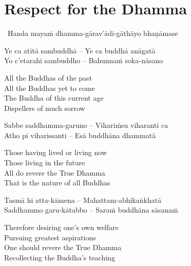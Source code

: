 \suttaRef{[Dhp 153-154]}


\section{Respect for the Dhamma}
\label{respect-for-the-dhamma}

\begin{leader}
  \anglebracketleft\ \hspace{-0.5mm}Handa mayaṁ dhamma-gārav'ādi-gāthāyo bhaṇāmase \hspace{-0.5mm}\anglebracketright\
\end{leader}

\begin{verses}
  Ye ca atītā sambuddhā – Ye ca buddhā anāgatā\\
  Yo c'etarahi sambuddho – Bahunnaṁ soka-nāsano
\end{verses}

\begin{english-verses}
  All the Buddhas of the past\\
  All the Buddhas yet to come\\
  The Buddha of this current age\\
  Dispellers of much sorrow
\end{english-verses}

\begin{verses}
  Sabbe saddhamma-garuno – Vihariṁsu viharanti ca\\
  Atho pi viharissanti – Esā buddhāna dhammatā
\end{verses}

\begin{english-verses}
  Those having lived or living now\\
  Those living in the future\\
  All do revere the True Dhamma\\
  That is the nature of all Buddhas
\end{english-verses}

\begin{verses}
  Tasmā hi atta-kāmena – Mahattam-abhikaṅkhatā\\
  Saddhammo garu-kātabbo – Saraṁ buddhāna sāsanaṁ
\end{verses}

\begin{english-verses}
  Therefore desiring one's own welfare\\
  Pursuing greatest aspirations\\
  One should revere the True Dhamma\\
  Recollecting the Buddha's teaching
\end{english-verses}

